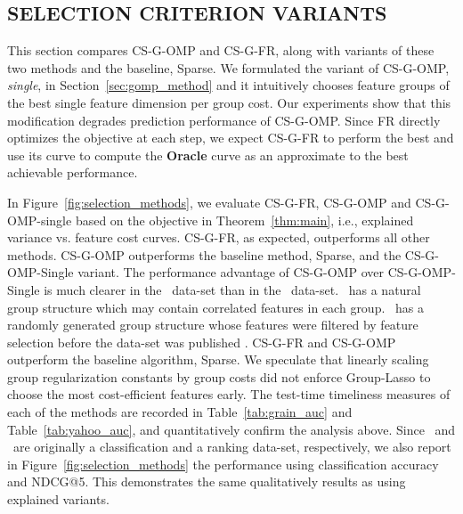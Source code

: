 \subsection{SELECTION CRITERION VARIANTS}
\label{sec:selection_methods}

This section compares CS-G-OMP and CS-G-FR, along with 
variants of these two methods and the baseline, Sparse. 
We formulated the variant of CS-G-OMP, \textit{single}, in Section~\ref{sec:gomp_method} and it intuitively chooses feature groups of the best single feature dimension per group cost. Our experiments show that this modification degrades prediction performance of CS-G-OMP. 
Since FR directly optimizes the objective at each step, we expect CS-G-FR to perform the best and use its curve to compute the \textbf{Oracle} curve as an approximate to the best achievable performance.

In Figure~\ref{fig:selection_methods}, we evaluate CS-G-FR, CS-G-OMP and CS-G-OMP-single based on the objective in Theorem~\ref{thm:main}, i.e., explained variance vs. feature cost curves. 
CS-G-FR, as expected, outperforms all other methods. CS-G-OMP outperforms the baseline method, Sparse, and the CS-G-OMP-Single variant. 
The performance advantage of CS-G-OMP over CS-G-OMP-Single is much clearer in the \Grain\ data-set than in the \YahooLTR\ data-set. \Grain\ has a natural group structure which may contain correlated features in each group. \YahooLTR\ has a randomly generated group structure whose features were filtered by feature selection before the data-set was published \citep{yahoo_ltr}. CS-G-FR and CS-G-OMP outperform the baseline algorithm, Sparse. We speculate that linearly scaling group regularization constants by group costs did not enforce Group-Lasso to choose the most cost-efficient features early. 
The test-time timeliness measures of each of the methods are recorded in Table~\ref{tab:grain_auc} and Table~\ref{tab:yahoo_auc},
and quantitatively confirm the analysis above. Since \Grain\, and \YahooLTR\, are originally a classification and a ranking data-set, respectively, we also report in Figure~\ref{fig:selection_methods} the performance using classification accuracy and NDCG@5. This demonstrates the same qualitatively results as using explained variants. 

